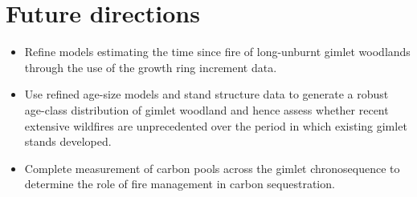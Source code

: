 \documentclass[version=last,
    paper=a4, %
    10pt, %
    usenames,
    dvipsnames,
    oneside, %
    headings=openany, %
    DIV=15 %
]{scrbook}
\begin{document}
\section*{Future directions}
\begin{itemize}
\itemsep1pt\parskip0pt
\item
  Refine models estimating the time since fire of long-unburnt gimlet
  woodlands through the use of the growth ring increment data.
\item
  Use refined age-size models and stand structure data to generate a
  robust age-class distribution of gimlet woodland and hence assess
  whether recent extensive wildfires are unprecedented over the period
  in which existing gimlet stands developed.
\item
  Complete measurement of carbon pools across the gimlet chronosequence
  to determine the role of fire management in carbon sequestration.
\end{itemize}



\end{document}
